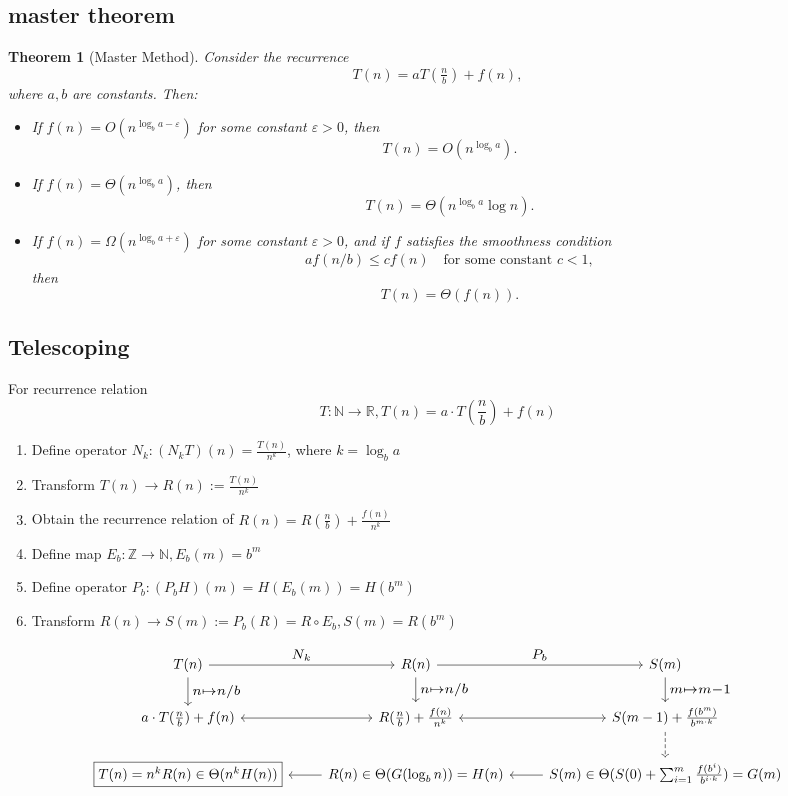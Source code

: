 \documentclass{article}
\newtheorem{theorem}{Theorem}[section]
\begin{document}
\subsection*{master theorem}
\begin{theorem}[Master Method]
Consider the recurrence
\[
T(n) = aT\!\left(\tfrac{n}{b}\right) + f(n),
\]
where $a, b$ are constants. Then:
\begin{itemize}
    \item[(A)] If $f(n) = O(n^{\log_b a - \varepsilon})$ for some constant $\varepsilon > 0$, then
    \[
    T(n) = O(n^{\log_b a}).
    \]

    \item[(B)] If $f(n) = \Theta(n^{\log_b a})$, then
    \[
    T(n) = \Theta(n^{\log_b a} \log n).
    \]

    \item[(C)] If $f(n) = \Omega(n^{\log_b a + \varepsilon})$ for some constant $\varepsilon > 0$, and if $f$ satisfies the smoothness condition
    \[
    af(n/b) \leq c f(n) \quad \text{for some constant } c < 1,
    \]
    then
    \[
    T(n) = \Theta(f(n)).
    \]
\end{itemize}
\end{theorem}







\subsection*{Telescoping}
For recurrence relation 
\[T: \mathbb{N} \rightarrow \mathbb{R},T(n) = a\cdot T(\frac{n}{b}) + f(n)\]
\begin{enumerate}
    \item Define operator $N_k: (N_kT)(n) = \frac{T(n)}{n^k}$, where $k = \log_ba$
    \item Transform $T(n) \rightarrow R(n) := \frac{T(n)}{n^k}$
    \item Obtain the recurrence relation of $R(n) = R(\frac{n}{b}) + \frac{f(n)}{n^k}$
    \item Define map $E_b: \mathbb{Z} \rightarrow \mathbb{N}, E_b(m) = b^m$
    \item Define operator $P_b: (P_b H)(m) = H(E_b(m)) = H(b^m)$
    \item Transform $R(n) \rightarrow S(m) := P_b(R) = R \circ E_b, S(m) = R(b^m)$
\end{enumerate} 
\[
\begin{tikzcd}[scale=1.35, transform shape]
T(n) \arrow[r, "N_k"] \arrow[d, "n \mapsto n/b"] & R(n) \arrow[r, "P_b"] \arrow[d,"n \mapsto n/b"]& S(m) \arrow[d, "m \mapsto m-1"]\\
a\cdot T(\frac{n}{b}) + f(n) \arrow[r, <->] & R(\frac{n}{b}) + \frac{f(n)}{n^k} \arrow[r, <->]& S(m - 1) + \frac{f(b^m)}{b^{m\cdot k}} \arrow[d, dashed,""]\\
\fbox{$T(n) = n^kR(n)\in \Theta(n^k H(n))$} &\arrow[l] R(n) \in \Theta(G(\log_bn)) = H(n) &\arrow[l] S(m) \in \Theta(S(0) + \sum_{i=1}^{m}\frac{f(b^i)}{b^{i\cdot k}}) = G(m)
\end{tikzcd}  
\]
\end{document}
